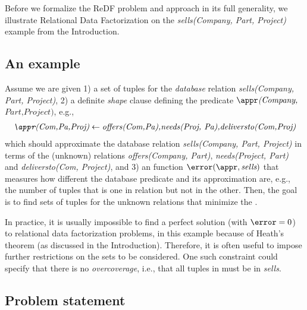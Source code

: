 
Before we formalize the ReDF problem and approach in its full generality, we illustrate Relational Data Factorization on the \textit{sells(Company, Part, Project)} example from the Introduction.

\subsection{An example}

Assume we are given 1) a set of tuples for the {\em database} relation \textit{sells(Company, Part, Project)},
2) a definite {\em shape} clause defining the predicate $\appr\textit{(Company,}$ $\textit{Part,Project)}$, e.g.,
\begin{align*}
 \textit{\appr(Com,Pa,Proj)} \leftarrow \textit{offers(Com,Pa),needs(Proj, Pa),deliversto(Com,Proj)}
\end{align*}
 which should approximate the database relation \textit{sells(Company, Part, Project)} in
 terms of the (unknown) relations \textit{offers(Company, Part)}, \textit{needs(Project, Part)} and \textit{deliversto(Com, Project)},
 and
3)   an   \error function $\error(\appr, \textit{sells})$ that measures how 
different the database predicate 
and its approximation are, e.g., the number of tuples that is one in relation but not in the other. 
Then, the goal is to find sets of tuples for the unknown relations that minimize the \error. 

In practice, it is usually impossible to find a perfect solution (with $\error=0$) to relational data factorization problems, in this example because of Heath's theorem \parencite{heath_theorem} (as discussed in the Introduction). Therefore, it is often useful to impose further restrictions on the sets to be considered. One such constraint could specify that there is no {\em overcoverage}, i.e., that all tuples in \appr must be in \textit{sells}.

\subsection{Problem statement}

